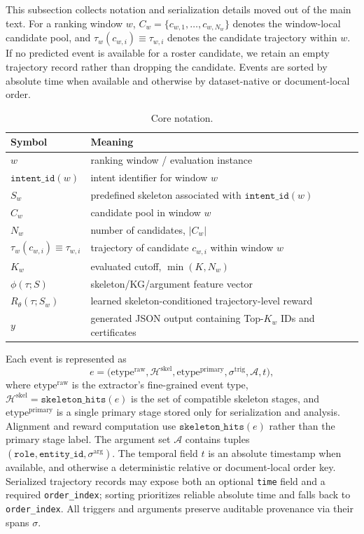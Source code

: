 \documentclass{article}
\begin{document}
This subsection collects notation and serialization details moved out of the main text.
For a ranking window $w$, $C_w=\{c_{w,1},\ldots,c_{w,N_w}\}$ denotes the window-local candidate pool, and $\tau_w(c_{w,i})\equiv\tau_{w,i}$ denotes the candidate trajectory within $w$.
If no predicted event is available for a roster candidate, we retain an empty trajectory record rather than dropping the candidate.
Events are sorted by absolute time when available and otherwise by dataset-native or document-local order.

\begin{table}[t]
\centering
\caption{Core notation.}
\label{tab:notation}
\small
\setlength{\tabcolsep}{4pt}
\begin{tabularx}{\linewidth}{lY}
\hline
Symbol & Meaning \\
\hline
$w$ & ranking window / evaluation instance \\
$\texttt{intent\_id}(w)$ & intent identifier for window $w$ \\
$S_w$ & predefined skeleton associated with $\texttt{intent\_id}(w)$ \\
$C_w$ & candidate pool in window $w$ \\
$N_w$ & number of candidates, $|C_w|$ \\
$\tau_w(c_{w,i})\equiv \tau_{w,i}$ & trajectory of candidate $c_{w,i}$ within window $w$ \\
$K_w$ & evaluated cutoff, $\min(K,N_w)$ \\
$\phi(\tau;S)$ & skeleton/KG/argument feature vector \\
$R_\theta(\tau;S_w)$ & learned skeleton-conditioned trajectory-level reward \\
$y$ & generated JSON output containing Top-$K_w$ IDs and certificates \\
\hline
\end{tabularx}
\end{table}

Each event is represented as
\begin{equation}
e =
\big(
\mathrm{etype}^{\mathrm{raw}},
\mathcal{H}^{\mathrm{skel}},
\mathrm{etype}^{\mathrm{primary}},
\sigma^{\mathrm{trig}},
\mathcal{A},
t
\big),
\end{equation}
where $\mathrm{etype}^{\mathrm{raw}}$ is the extractor's fine-grained event type, $\mathcal{H}^{\mathrm{skel}}=\texttt{skeleton\_hits}(e)$ is the set of compatible skeleton stages, and $\mathrm{etype}^{\mathrm{primary}}$ is a single primary stage stored only for serialization and analysis.
Alignment and reward computation use $\texttt{skeleton\_hits}(e)$ rather than the primary stage label.
The argument set $\mathcal{A}$ contains tuples $(\texttt{role},\texttt{entity\_id},\sigma^{\mathrm{arg}})$.
The temporal field $t$ is an absolute timestamp when available, and otherwise a deterministic relative or document-local order key.
Serialized trajectory records may expose both an optional \texttt{time} field and a required \texttt{order\_index}; sorting prioritizes reliable absolute time and falls back to \texttt{order\_index}.
All triggers and arguments preserve auditable provenance via their spans $\sigma$.
\end{document}
